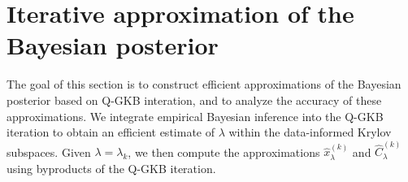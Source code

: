\documentclass[]{myarticle}
\begin{document}
\section{Iterative approximation of the Bayesian posterior}\label{sec4}
The goal of this section is to construct efficient approximations of the Bayesian posterior based on Q-GKB interation, and to analyze the accuracy of these approximations. We integrate empirical Bayesian inference into the Q-GKB iteration to obtain an efficient estimate of $\lambda$ within the data-informed Krylov subspaces. Given $\lambda=\lambda_k$, we then compute the approximations $\widehat{x}_{\lambda}^{(k)}$ and $\widehat{C}_{\lambda}^{(k)}$ using byproducts of the Q-GKB iteration.

\end{document}
